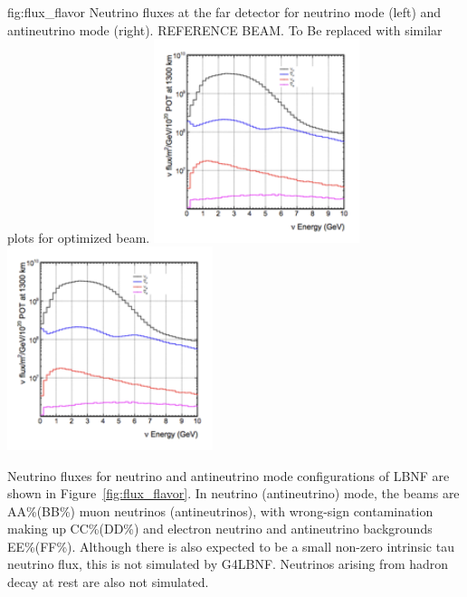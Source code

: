 \begin{dunefigure}{fig:flux_flavor}
{Neutrino fluxes at the far detector for neutrino mode (left) and
antineutrino mode (right).  REFERENCE BEAM.  To Be replaced with similar plots for optimized beam. }
    \includegraphics[width=0.45\textwidth]{graphics/Ref_beam_log_flux.png}
     \includegraphics[width=0.45\textwidth]{graphics/Ref_beam_log_flux.png}
\end{dunefigure}


Neutrino fluxes for neutrino and antineutrino mode configurations of LBNF are shown in Figure~\ref{fig:flux_flavor}.  In neutrino (antineutrino) mode, the beams are AA\%(BB\%) muon neutrinos (antineutrinos), with wrong-sign contamination making up CC\%(DD\%) and electron neutrino and antineutrino backgrounds EE\%(FF\%).  Although there is also expected to be a small non-zero intrinsic tau neutrino flux, this is not simulated by G4LBNF.  Neutrinos arising from hadron decay at rest are also not simulated.  

